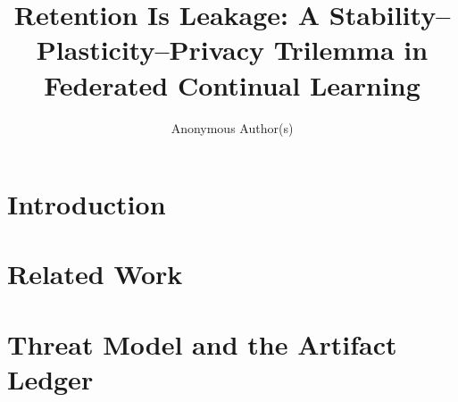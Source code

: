 \documentclass[11pt]{article}
\title{Retention Is Leakage: A Stability--Plasticity--Privacy Trilemma in Federated Continual Learning}
\author{Anonymous Author(s)}
\date{}
\begin{document}
\maketitle

\begin{abstract}
\end{abstract}

\section{Introduction}

\section{Related Work}

\section{Threat Model and the Artifact Ledger}
\begin{table}[htbp]
  \centering
  
  \caption{Artifact family taxonomy (F1--F8). See \texttt{RESEARCH\_PLAN.md \S2.2} and
    \texttt{paper/PAPER\_BRIEFING.md} \S3 for the underlying discussion.}
  \label{tab:taxonomy}
\end{table}
\end{document}
